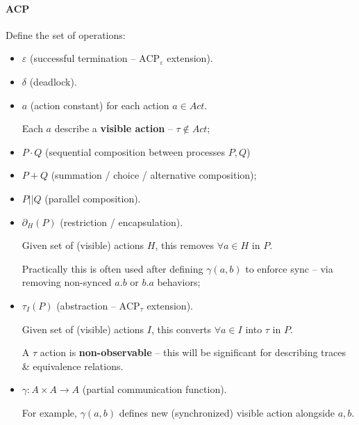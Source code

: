 \documentclass[99-notes-packed.tex]{subfiles}
\begin{document}
\paragraph*{ACP}
Define the set of operations:
\begin{itemize}
    \item {
        $\varepsilon$ (successful termination -- $\mathrm{ACP}_{\varepsilon}$ extension).
    }
    \item {
        $\delta$ (deadlock).
    }
    \item {
        $a$ (action constant) for each action $a \in {Act}$.

        Each $a$ describe a \textbf{visible action} -- $\tau \notin {Act}$;
    }
    \item {
        $P \cdot Q$ (sequential composition between processes $P, Q$)
    }
    \item {
        $P + Q$ (summation / choice / alternative composition);
    }
    \item {
        $P || Q$ (parallel composition).
    }
    \item {
        ${\partial}_{H}(P)$ (restriction / encapsulation).

        Given set of (visible) actions $H$, this removes $\forall a \in H$ in $P$.

        Practically this is often used after defining $\gamma(a, b)$ to enforce sync -- via removing non-synced $a.b$ or $b.a$ behaviors;
    }
    \item {
        ${\tau}_{I}(P)$ (abstraction -- $\mathrm{ACP}_{\tau}$ extension).

        Given set of (visible) actions $I$, this converts $\forall a \in I$ into $\tau$ in $P$.

        A $\tau$ action is \textbf{non-observable} -- this will be significant for describing traces \& equivalence relations.
    }
    \item {
        $\gamma: A \times A \rightarrow A$ (partial communication function).

        For example, $\gamma(a, b)$ defines new (synchronized) visible action alongside $a, b$.
    }
\end{itemize}
\end{document}
